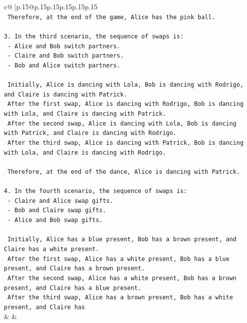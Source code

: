 \documentclass{article}
\begin{document}
{\begin{supertabular}{c@{$\;$}|p{.15\linewidth}@{}p{.15\linewidth}p{.15\linewidth}p{.15\linewidth}p{.15\linewidth}p{.15\linewidth}}
{{{\\ 
\texttt{   Therefore, at the end of the game, Alice has the pink ball.} \\
\\ 
\texttt{3. In the third scenario, the sequence of swaps is:} \\
\texttt{   {-} Alice and Bob switch partners.} \\
\texttt{   {-} Claire and Bob switch partners.} \\
\texttt{   {-} Bob and Alice switch partners.} \\
\\ 
\texttt{   Initially, Alice is dancing with Lola, Bob is dancing with Rodrigo, and Claire is dancing with Patrick.} \\
\texttt{   After the first swap, Alice is dancing with Rodrigo, Bob is dancing with Lola, and Claire is dancing with Patrick.} \\
\texttt{   After the second swap, Alice is dancing with Lola, Bob is dancing with Patrick, and Claire is dancing with Rodrigo.} \\
\texttt{   After the third swap, Alice is dancing with Patrick, Bob is dancing with Lola, and Claire is dancing with Rodrigo.} \\
\\ 
\texttt{   Therefore, at the end of the dance, Alice is dancing with Patrick.} \\
\\ 
\texttt{4. In the fourth scenario, the sequence of swaps is:} \\
\texttt{   {-} Claire and Alice swap gifts.} \\
\texttt{   {-} Bob and Claire swap gifts.} \\
\texttt{   {-} Alice and Bob swap gifts.} \\
\\ 
\texttt{   Initially, Alice has a blue present, Bob has a brown present, and Claire has a white present.} \\
\texttt{   After the first swap, Alice has a white present, Bob has a blue present, and Claire has a brown present.} \\
\texttt{   After the second swap, Alice has a white present, Bob has a brown present, and Claire has a blue present.} \\
\texttt{   After the third swap, Alice has a brown present, Bob has a white present, and Claire has} \\
            }
        }
    }
    & & \\ \\


\end{supertabular}}
\end{document}

